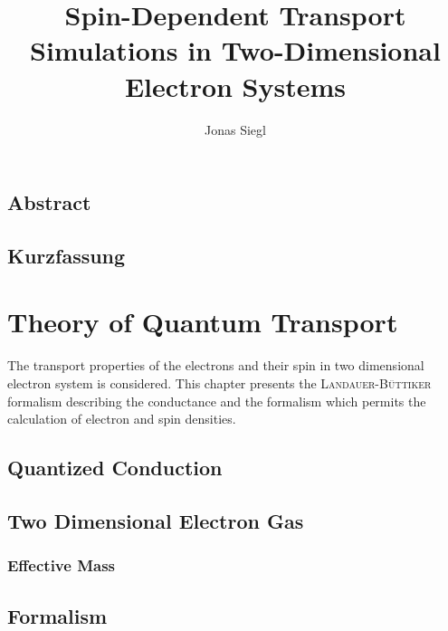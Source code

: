 
\author{Jonas Siegl}
\title{Spin-Dependent Transport Simulations in Two-Dimensional Electron Systems}






\pagestyle{bib} %
\tableofcontents
\clearpage
\pagestyle{abstract}
\section*{Abstract}

\clearpage
\section*{Kurzfassung}

\clearpage
\pagestyle{main}
\chapter{Theory of Quantum Transport}
The transport properties of the electrons and their spin in two dimensional electron system is considered. This chapter presents the \textsc{Landauer-B\"uttiker} formalism describing the conductance and the \gfnc{} formalism which permits the calculation of electron and spin densities.
\section{Quantized Conduction}
  
  \section{Two Dimensional Electron Gas}
    
      \subsection{Effective Mass \hamil{}}
	
	
  \section{\cgfnc{} Formalism}
  
